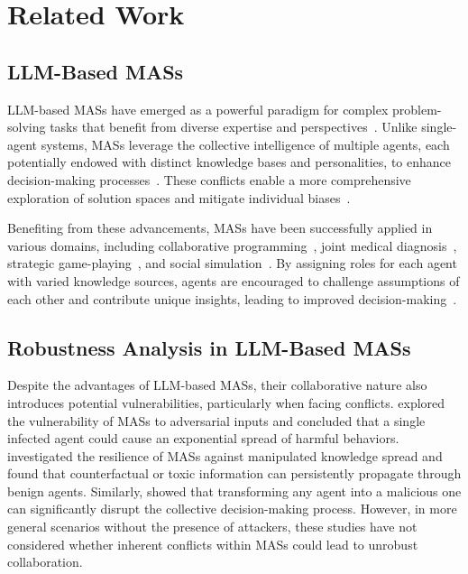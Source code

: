 \section{Related Work}
\label{Sec: Related Work}

\subsection{LLM-Based MASs}
LLM-based MASs have emerged as a powerful paradigm for complex problem-solving tasks that benefit from diverse expertise and perspectives~\cite{agent_survey, MAS_survey}. 
Unlike single-agent systems, MASs leverage the collective intelligence of multiple agents, each potentially endowed with distinct knowledge bases and personalities, to enhance decision-making processes~\cite{Multi_agent_cross_domain_knowledge_discovery, RoundTable}. 
These conflicts enable a more comprehensive exploration of solution spaces and mitigate individual biases~\cite{generative_agents, collective_agents}.

Benefiting from these advancements, MASs have been successfully applied in various domains, including collaborative programming~\cite{AutoGen, ChatDev, MetaGPT}, joint medical diagnosis~\cite{MedAgents}, strategic game-playing~\cite{multi_agent_game_playing}, and social simulation~\cite{multi_agent_social_simulation}. 
By assigning roles for each agent with varied knowledge sources, agents are encouraged to challenge assumptions of each other and contribute unique insights, leading to improved decision-making~\cite{multi_agent_cognitive_synergy, multi_agent_social_psychology}.



\subsection{Robustness Analysis in LLM-Based MASs}
Despite the advantages of LLM-based MASs, their collaborative nature also introduces potential vulnerabilities, particularly when facing conflicts. 
\citet{agent_smith} explored the vulnerability of MASs to adversarial inputs and concluded that a single infected agent could cause an exponential spread of harmful behaviors. 
\citet{flooding_spread} investigated the resilience of MASs against manipulated knowledge spread and found that counterfactual or toxic information can persistently propagate through benign agents. 
Similarly, \citet{Resilience_of_Multi-Agent_Systems} showed that transforming any agent into a malicious one can significantly disrupt the collective decision-making process. 
However, in more general scenarios without the presence of attackers, these studies have not considered whether inherent conflicts within MASs could lead to unrobust collaboration.

